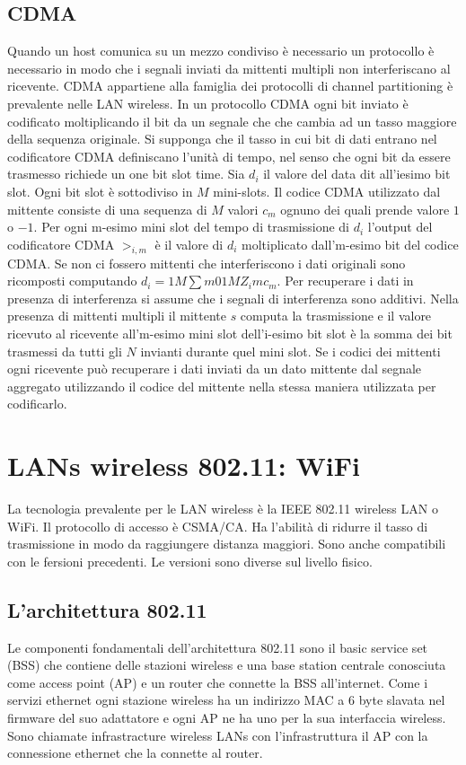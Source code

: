 \subsection{CDMA}
Quando un host comunica su un mezzo condiviso \`e necessario un protocollo \`e necessario in modo che i segnali inviati da mittenti multipli non interferiscano al ricevente. CDMA appartiene alla famiglia dei
protocolli di channel partitioning \`e prevalente nelle LAN wireless. In un protocollo CDMA ogni bit inviato \`e codificato moltiplicando il bit da un segnale che che cambia ad un tasso maggiore della sequenza 
originale. Si supponga che il tasso in cui bit di dati entrano nel codificatore CDMA definiscano l'unit\`a di tempo, nel senso che ogni bit da essere trasmesso richiede un one bit slot time. Sia $d_i$ il valore del
data dit all'iesimo bit slot. Ogni bit slot \`e sottodiviso in $M$ mini-slots. Il codice CDMA utilizzato dal mittente consiste di una sequenza di $M$ valori $c_m$ ognuno dei quali prende valore $1$ o $-1$. Per
ogni m-esimo mini slot del tempo di trasmissione di $d_i$ l'output del codificatore CDMA $>_{i,m}$ \`e il valore di $d_i$ moltiplicato dall'm-esimo bit del codice CDMA. Se non ci fossero mittenti che
interferiscono i dati originali sono ricomposti computando $d_i=1M\sum m 01MZ_imc_m$. Per recuperare i dati in presenza di interferenza si assume che i segnali di interferenza sono additivi. Nella presenza 
di mittenti multipli il mittente $s$ computa la trasmissione e il valore ricevuto al ricevente all'm-esimo mini slot dell'i-esimo bit slot \`e la somma dei bit trasmessi da tutti gli $N$ invianti durante quel mini slot.
Se i codici dei mittenti ogni ricevente pu\`o recuperare i dati inviati da un dato mittente dal segnale aggregato utilizzando il codice del mittente nella stessa maniera utilizzata per codificarlo. 
\section{LANs wireless 802.11: WiFi}
La tecnologia prevalente per le LAN wireless \`e la IEEE 802.11 wireless LAN o WiFi. Il protocollo di accesso \`e CSMA/CA. Ha l'abilit\`a di ridurre il tasso di trasmissione in modo da raggiungere distanza 
maggiori. Sono anche compatibili con le fersioni precedenti. Le versioni sono diverse sul livello fisico. 
\subsection{L'architettura 802.11}
Le componenti fondamentali dell'architettura 802.11 sono il basic service set (BSS) che contiene delle stazioni wireless e una base station centrale conosciuta come access point (AP) e un router che connette la
BSS all'internet. Come i servizi ethernet ogni stazione wireless ha un indirizzo MAC a 6 byte slavata nel firmware del suo adattatore e ogni AP ne ha uno per la sua interfaccia wireless. Sono chiamate 
infrastracture wireless LANs con l'infrastruttura il AP con la connessione ethernet che la connette al router. 
